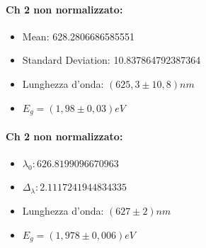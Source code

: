 \documentclass{article}
\begin{document}
\begin{center}
    \begin{minipage}{0.4\textwidth}
        \paragraph{Ch 2 non normalizzato:}
        \begin{itemize}
            \item Mean: 628.2806686585551
            \item Standard Deviation: 10.837864792387364
            \item Lunghezza d'onda:  $(625,3 \pm10,8)nm$
            \item $E_g=(1,98\pm0,03  )eV$
        \end{itemize}
    \end{minipage}
    \hfill
    \begin{minipage}{0.4\textwidth}
        \paragraph{Ch 2 non normalizzato:}
        \begin{itemize}
            \item $\lambda_0: 626.8199096670963$
            \item $\Delta_\lambda: 2.1117241944834335$
            \item Lunghezza d'onda:  $(627 \pm2)nm$
            \item $E_g=(  1,978\pm 0,006 )eV$
        \end{itemize}
    \end{minipage}
\end{center}
\hrulefill
\end{document}
